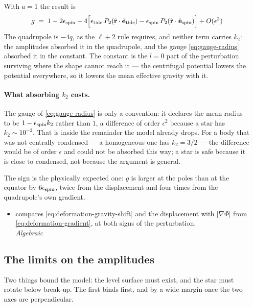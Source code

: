 With $a = 1$ the result is
\begin{equation}
  g \;=\; 1 - 2\epsilon_\text{spin}
    - 4\Bigl[\epsilon_\text{tide}\,P_2(\hat{\mathbf r}\cdot\hat{\mathbf e}_\text{tide})
    - \epsilon_\text{spin}\,P_2(\hat{\mathbf r}\cdot\hat{\mathbf e}_\text{spin})\Bigr]
    + O(\epsilon^{2})
  \label{eq:deformation-gravity-first-order}
\end{equation}
The quadrupole is $-4q$, as the $\ell + 2$ rule requires, and neither term carries $k_2$: the
amplitudes absorbed it in the quadrupole, and the gauge \eqref{eq:gauge-radius} absorbed it in the
constant.  The constant is the $l = 0$ part of the perturbation surviving where the shape cannot
reach it --- the centrifugal potential lowers the potential everywhere, so it lowers the mean
effective gravity with it.

\paragraph{What absorbing $k_2$ costs.}  The gauge of \eqref{eq:gauge-radius} is only a
convention: it declares the mean radius to be $1 - \epsilon_\text{spin}{}k_2$ rather than $1$,
a difference of order $\epsilon^{2}$ because a star has $k_2 \sim 10^{-2}$.  That is inside the
remainder the model already drops.  For a body that was not centrally condensed --- a homogeneous
one has $k_2 = 3/2$ --- the difference would be of order $\epsilon$ and could not be absorbed this
way; a star is safe because it is close to condensed, not because the argument is general.

The sign is the physically expected one: $g$ is larger at the poles than at the equator by
$6\epsilon_\text{spin}$, twice from the displacement and four times from the quadrupole's own
gradient.

\begin{itemize}
  \item[$\checkmark$]  compares \eqref{eq:deformation-gravity-shift}
    and the displacement with $|\nabla\Phi|$ from \eqref{eq:deformation-gradient}, at both signs of
    the perturbation.
    \\[1pt] \quad \emph{Algebraic}
\end{itemize}
\subsection{The limits on the amplitudes}
\label{sec:deformation-limits}

Two things bound the model: the level surface must exist, and the star must rotate below
break-up.  The first binds first, and by a wide margin once the two axes are perpendicular.

